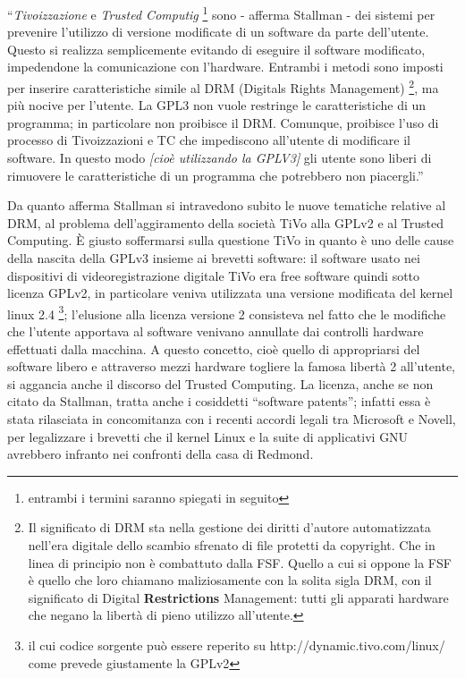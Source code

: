 
``\textit{Tivoizzazione} e \textit{Trusted Computig} \footnote{entrambi i termini saranno spiegati in seguito} sono - afferma Stallman - dei sistemi per prevenire l'utilizzo di versione modificate di un software da parte dell'utente. Questo si realizza semplicemente evitando di eseguire il software modificato, impedendone la comunicazione con l'hardware. Entrambi i metodi sono imposti per inserire caratteristiche simile al DRM (Digitals Rights Management) \footnote{Il significato di DRM sta nella gestione dei diritti d'autore automatizzata nell'era digitale dello scambio sfrenato di file protetti da copyright. Che in linea di principio non è combattuto dalla FSF. Quello a cui si oppone la FSF è quello che loro chiamano maliziosamente con la solita sigla DRM, con il significato di Digital \textbf{Restrictions} Management: tutti gli apparati hardware che negano la libertà di pieno utilizzo all'utente.}, ma più nocive per l'utente. La GPL3 non vuole restringe le caratteristiche di un programma; in particolare non proibisce il DRM. Comunque, proibisce l'uso di processo di Tivoizzazioni e TC che impediscono all'utente di modificare il software. In questo modo \textit{[cioè utilizzando la GPLV3]} gli utente sono liberi di rimuovere le caratteristiche di un programma che potrebbero non piacergli.''

Da quanto afferma Stallman si intravedono subito le nuove tematiche relative al DRM, al problema dell'aggiramento della società TiVo alla GPLv2 e al Trusted Computing. \`E giusto soffermarsi sulla questione TiVo in quanto è uno delle cause della nascita della GPLv3 insieme ai brevetti software: il software usato nei dispositivi di videoregistrazione digitale TiVo era free software quindi sotto licenza GPLv2, in particolare veniva utilizzata una versione modificata del kernel linux 2.4 \footnote{il cui codice sorgente può essere reperito su http://dynamic.tivo.com/linux/ come prevede giustamente la GPLv2 }; l'elusione alla licenza versione 2 consisteva nel fatto che le modifiche che l'utente apportava al software venivano annullate dai controlli hardware effettuati dalla macchina. A questo concetto, cioè quello di appropriarsi del software libero e attraverso mezzi hardware togliere la famosa libertà 2 all'utente, si aggancia anche il discorso del Trusted Computing. La licenza, anche se non citato da Stallman, tratta anche i cosiddetti ``software patents''; infatti essa è stata rilasciata in concomitanza con i recenti accordi legali tra Microsoft e Novell, per legalizzare i brevetti che il kernel Linux e la suite di applicativi GNU avrebbero infranto nei confronti della casa di Redmond.

